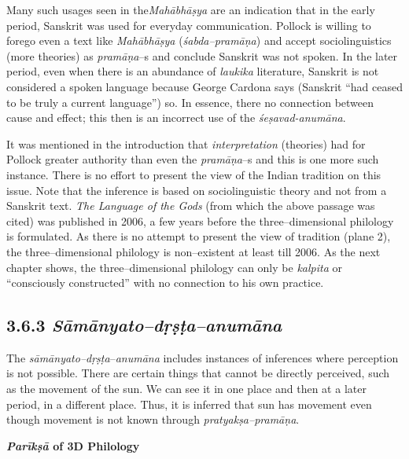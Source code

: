 Many such usages seen in the\textit{Mahābhāṣya} are an indication that in the early period, Sanskrit was used for everyday communication. Pollock is willing to forego even a text like \textit{Mahābhāṣya }(\textit{śabda–pramāṇa}) and accept sociolinguistics (more theories) as \textit{pramāṇa}–s and conclude Sanskrit was not spoken. In the later period, even when there is an abundance of \textit{laukika} literature, Sanskrit is not considered a spoken language because George Cardona  says (Sanskrit “had ceased to be truly a current language”) so. In essence, there no connection between cause and effect; this then is an incorrect use of the \textit{śeṣavad-anumāna}.

It was mentioned in the introduction that \textit{interpretation} (theories) had for Pollock greater authority than even the\textit{ pramāṇa}–s and this is one more such instance. There is no effort to present the view of the Indian tradition on this issue. Note that the inference is based on sociolinguistic theory and not from a Sanskrit text. \textit{The Language of the Gods} (from which the above passage was cited) was published in 2006, a few years before the three–dimensional philology is formulated. As there is no attempt to present the view of tradition (plane 2), the three–dimensional philology is non–existent at least till 2006. As the next chapter shows, the three–dimensional philology can only be \textit{kalpita} or “consciously constructed” with no connection to his own practice.

\subsection*{3.6.3 {\it {\bfseries Sāmānyato–dṛṣṭa–anumāna}}}

The \textit{sāmānyato–dṛṣṭa}–\textit{anumāna} includes instances of inferences where perception is not possible. There are certain things that cannot be directly perceived, such as the movement of the sun. We can see it in one place and then at a later period, in a different place. Thus, it is inferred that sun has movement even though movement is not known through\textit{ pratyakṣa–pramāṇa}.

\textbf{\textit{Parīkṣā} of 3D Philology}


